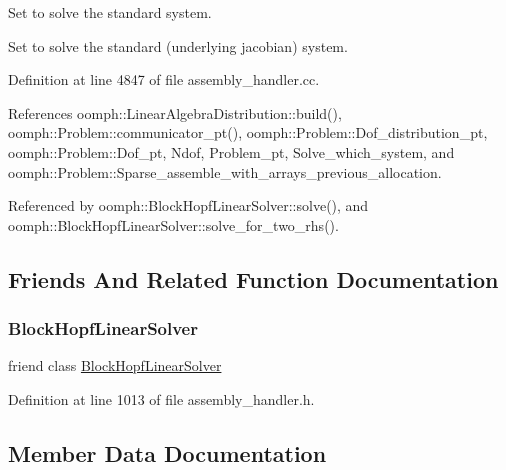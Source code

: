 Set to solve the standard system. 

Set to solve the standard (underlying jacobian) system. 

Definition at line 4847 of file assembly\+\_\+handler.\+cc.



References oomph\+::\+Linear\+Algebra\+Distribution\+::build(), oomph\+::\+Problem\+::communicator\+\_\+pt(), oomph\+::\+Problem\+::\+Dof\+\_\+distribution\+\_\+pt, oomph\+::\+Problem\+::\+Dof\+\_\+pt, Ndof, Problem\+\_\+pt, Solve\+\_\+which\+\_\+system, and oomph\+::\+Problem\+::\+Sparse\+\_\+assemble\+\_\+with\+\_\+arrays\+\_\+previous\+\_\+allocation.



Referenced by oomph\+::\+Block\+Hopf\+Linear\+Solver\+::solve(), and oomph\+::\+Block\+Hopf\+Linear\+Solver\+::solve\+\_\+for\+\_\+two\+\_\+rhs().



\subsection{Friends And Related Function Documentation}
\mbox{\label{classoomph_1_1HopfHandler_a199677d64d3b2f908690d10a2398b737}} 
\subsubsection{\texorpdfstring{Block\+Hopf\+Linear\+Solver}{BlockHopfLinearSolver}}
{\footnotesize\ttfamily friend class \hyperlink{classoomph_1_1BlockHopfLinearSolver}{Block\+Hopf\+Linear\+Solver}\hspace{0.3cm}{\ttfamily [friend]}}



Definition at line 1013 of file assembly\+\_\+handler.\+h.



\subsection{Member Data Documentation}
\mbox{\label{classoomph_1_1HopfHandler_a99aabcf5ac54311f1f7acb0dbd431b84}} 
